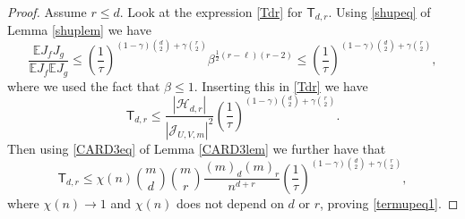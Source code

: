 \documentclass[reqno]{amsart}
\theoremstyle{theorem}
\theoremstyle{definition}
\theoremstyle{remark}
\def\E{\mathbb{E}}
\def\HH{\mathscr{H}}
\newcommand{\1}{{\text{\Large $\mathfrak 1$}}}	%
\numberwithin{equation}{section}
\def\JJ{\mathscr J}
\def\TTT{\mathsf T}
\begin{document}
\begin{proof}
Assume $r \le d$.
Look at the expression \eqref{Tdr} for $\TTT_{d,r}$.
Using \eqref{shupeq} of Lemma \ref{shuplem} we have
\[
\frac{\E J_f J_g}{\E J_f \E J_g}
\le  \left( \frac{1}{\tau} \right)^{(1-\gamma)\binom{d}{2} + \gamma\binom{r}{2}}            
\beta^{\frac{1}{2}(r - \ell)(r-2)}
\le  \left( \frac{1}{\tau} \right)^{(1-\gamma)\binom{d}{2} + \gamma\binom{r}{2}},
\]
where we used the fact that $\beta \le 1$.
Inserting this in \eqref{Tdr} we have
\[
\TTT_{d, r} 
\le \frac{\left|\HH_{d, r}\right|}{\left|\JJ_{U, V,m}\right|^2}
\left( \frac{1}{\tau} \right)^{(1-\gamma)\binom{d}{2} + \gamma\binom{r}{2}}.
\]
Then using \eqref{CARD3eq} of Lemma \ref{CARD3lem} we further have that
\[
\TTT_{d,r} \le \chi (n) \binom{m}{d} \binom{m}{r} \frac{(m)_d (m)_r}{n^{d+r}}
\left( \frac{1}{\tau} \right)^{(1-\gamma) \binom{d}{2} + \gamma \binom{r}{2}},
\]
where $\chi(n) \to 1$ and $\chi(n)$ does not depend on $d$ or $r$,
proving \eqref{termupeq1}.


\end{proof}
\end{document}
